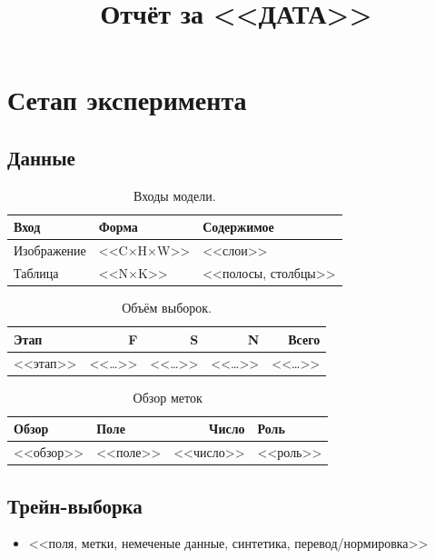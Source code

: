 \documentclass[11pt,a4paper]{article}
\title{Отчёт за <<ДАТА>>}
\author{}
\date{}
\begin{document}
\maketitle

\section{Сетап эксперимента}

\subsection{Данные}

\begin{table}[H]\centering\small\caption{Входы модели.}
\begin{tabularx}{\linewidth}{llY}
\toprule Вход & Форма & Содержимое \\ \midrule
Изображение & <<C$\times$H$\times$W>> & <<слои>> \\
Таблица & <<N$\times$K>> & <<полосы, столбцы>> \\
\bottomrule\end{tabularx}\end{table}

\begin{table}[H]\centering\small\caption{Объём выборок.}
\begin{tabular}{lrrrr}
\toprule Этап & F & S & N & Всего \\ \midrule
<<этап>> & <<…>> & <<…>> & <<…>> & <<…>> \\
\bottomrule\end{tabular}\end{table}

\begin{table}[H]
\centering
\caption{Обзор меток}
\begin{tabular}{llrl}
\toprule
Обзор & Поле & Число & Роль \\
\midrule
<<обзор>> & <<поле>> & <<число>> & <<роль>> \\
\bottomrule
\end{tabular}
\end{table}


\subsection{Трейн-выборка}
\begin{itemize}
  \item <<поля, метки, немеченые данные, синтетика, перевод/нормировка>>
\end{itemize}
\end{document}
